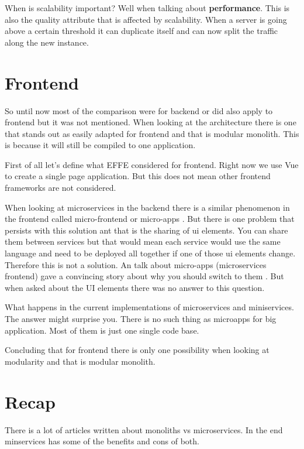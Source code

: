 When is scalability important? Well when talking about \textbf{performance}. This is also the quality attribute that is affected by scalability. When a server is going above a certain threshold it can duplicate itself and can now split the traffic along the new instance.

\section{Frontend}
\label{sec:Frontend}

So until now most of the comparison were for backend or did also apply to frontend but it was not mentioned. When looking at the architecture there is one that stands out as easily adapted for frontend and that is modular monolith. This is because it will still be compiled to one application.

First of all let’s define what EFFE considered for frontend. Right now we use Vue to create a single page application. But this does not mean other frontend frameworks are not considered.

When looking at microservices in the backend there is a similar phenomenon in the frontend called micro-frontend or micro-apps \cite{microFrontends}. But there is one problem that persists with this solution ant that is the sharing of ui elements. You can share them between services but that would mean each service would use the same language and need to be deployed all together if one of those ui elements change. Therefore this is not a solution. An talk about micro-apps (microservices frontend) gave a convincing story about why you should switch to them \cite{frontendMicroservices}. But when asked about the UI elements there was no answer to this question.

What happens in the current implementations of microservices and miniservices. The answer might surprise you. There is no such thing as microapps for big application. Most of them is just one single code base.

Concluding that for frontend there is only one possibility when looking at modularity and that is modular monolith.

\section{Recap}

There is a lot of articles written about monoliths vs microservices. In the end minservices has some of the benefits and cons of both.

